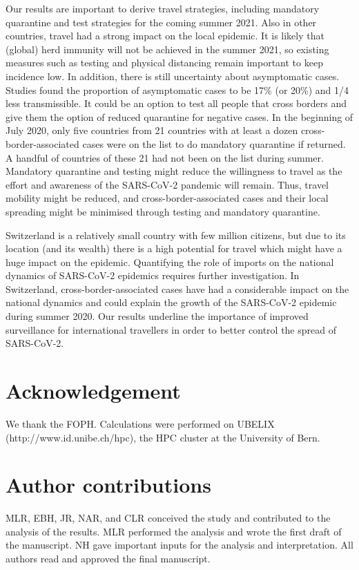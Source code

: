 \documentclass[10pt, a4paper, twoside]{article}
\begin{document}
\begin{multicols}{2}
Our results are important to derive travel strategies, including mandatory quarantine and test strategies for the coming summer 2021.
Also in other countries, travel had a strong impact on the local epidemic.\cite{russell_effect_2021,hodcroft_emergence_2020}
It is likely that (global) herd immunity will not be achieved in the summer 2021, so existing measures such as testing and physical distancing remain important to keep incidence low.
In addition, there is still uncertainty about asymptomatic cases.\cite{nogrady_what_2020}
Studies found the proportion of asymptomatic cases to be 17\% (or 20\%) and 1/4 less transmissible.\cite{byambasuren_estimating_2020,buitrago-garcia_occurrence_2020,bi_household_2020}
It could be an option to test all people that cross borders and give them the option of reduced quarantine for negative cases.\cite{ashcroft_quantifying_2021}
In the beginning of July 2020, only five countries from 21 countries with at least a dozen cross-border-associated cases were on the list to do mandatory quarantine if returned.
A handful of countries of these 21 had not been on the list during summer.
Mandatory quarantine and testing might reduce the willingness to travel as the effort and awareness of the SARS-CoV-2 pandemic will remain.
Thus, travel mobility might be reduced, and cross-border-associated cases and their local spreading might be minimised through testing and mandatory quarantine.



Switzerland is a relatively small country with few million citizens, but due to its location (and its wealth) there is a high potential for travel which might have a huge impact on the epidemic.
Quantifying the role of imports on the national dynamics of SARS-CoV-2 epidemics requires further investigation. 
In Switzerland, cross-border-associated cases have had a considerable impact on the national dynamics and could explain the growth of the SARS-CoV-2 epidemic during summer 2020. 
Our results underline the importance of improved surveillance for international travellers in order to better control the spread of SARS-CoV-2.


\section{Acknowledgement}
We thank the FOPH.  Calculations were performed on UBELIX (http://www.id.unibe.ch/hpc), the HPC cluster at the University of Bern.

\section{Author contributions}
MLR, EBH, JR, NAR, and CLR conceived the study and contributed to the analysis of the results. 
MLR performed the analysis and wrote the first draft of the manuscript. 
NH gave important inputs for the analysis and interpretation. 
All authors read and approved the final manuscript.


\end{multicols}
\end{document}
